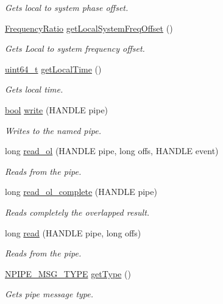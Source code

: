 \begin{DoxyCompactItemize}
\begin{DoxyCompactList}\small\item\em Gets local to system phase offset. \end{DoxyCompactList}\item 
\hyperlink{ptptypes_8hpp_a84de47dc2ed889ecd2b61706d3ad0f2e}{Frequency\+Ratio} \hyperlink{class_win_n_pipe_offset_update_message_a921c47366f1d2bc72191d6b5043c2678}{get\+Local\+System\+Freq\+Offset} ()
\begin{DoxyCompactList}\small\item\em Gets Local to system frequency offset. \end{DoxyCompactList}\item 
\hyperlink{parse_8c_aec6fcb673ff035718c238c8c9d544c47}{uint64\+\_\+t} \hyperlink{class_win_n_pipe_offset_update_message_a12ab10ecfaff3e387c466956e0f5fe0b}{get\+Local\+Time} ()
\begin{DoxyCompactList}\small\item\em Gets local time. \end{DoxyCompactList}\item 
\hyperlink{avb__gptp_8h_af6a258d8f3ee5206d682d799316314b1}{bool} \hyperlink{class_windows_n_pipe_message_a1a6e0ed523a40350e1e0c44510d9caab}{write} (H\+A\+N\+D\+LE pipe)
\begin{DoxyCompactList}\small\item\em Writes to the named pipe. \end{DoxyCompactList}\item 
long \hyperlink{class_windows_n_pipe_message_a25ac1b47d55092db7e7204a83f6d3367}{read\+\_\+ol} (H\+A\+N\+D\+LE pipe, long offs, H\+A\+N\+D\+LE event)
\begin{DoxyCompactList}\small\item\em Reads from the pipe. \end{DoxyCompactList}\item 
long \hyperlink{class_windows_n_pipe_message_ad65e923c3adebfc9ff97d89007bf5633}{read\+\_\+ol\+\_\+complete} (H\+A\+N\+D\+LE pipe)
\begin{DoxyCompactList}\small\item\em Reads completely the overlapped result. \end{DoxyCompactList}\item 
long \hyperlink{class_windows_n_pipe_message_aefaf53a62a09b658795b4bff415c8c68}{read} (H\+A\+N\+D\+LE pipe, long offs)
\begin{DoxyCompactList}\small\item\em Reads from the pipe. \end{DoxyCompactList}\item 
\hyperlink{windows__ipc_8hpp_a5a7d5ebd4af251aa73a4afcce1dc68a1}{N\+P\+I\+P\+E\+\_\+\+M\+S\+G\+\_\+\+T\+Y\+PE} \hyperlink{class_windows_n_pipe_message_a7bafd143bb174fae7ef70730c8469f1c}{get\+Type} ()
\begin{DoxyCompactList}\small\item\em Gets pipe message type. \end{DoxyCompactList}\end{DoxyCompactItemize}

